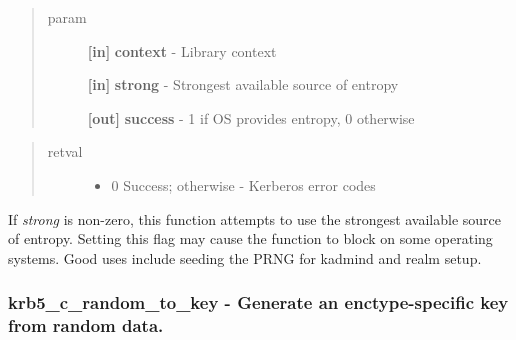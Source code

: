\documentclass[letterpaper,10pt,english]{sphinxmanual}
\begin{document}
\begin{quote}\begin{description}
\item[{param}] \leavevmode
\textbf{{[}in{]}} \textbf{context} - Library context

\textbf{{[}in{]}} \textbf{strong} - Strongest available source of entropy

\textbf{{[}out{]}} \textbf{success} - 1 if OS provides entropy, 0 otherwise

\end{description}\end{quote}
\begin{quote}\begin{description}
\item[{retval}] \leavevmode\begin{itemize}
\item {} 
0   Success; otherwise - Kerberos error codes

\end{itemize}

\end{description}\end{quote}

If \emph{strong} is non-zero, this function attempts to use the strongest available source of entropy. Setting this flag may cause the function to block on some operating systems. Good uses include seeding the PRNG for kadmind and realm setup.


\subsubsection{krb5\_c\_random\_to\_key -  Generate an enctype-specific key from random data.}
\label{appdev/refs/api/krb5_c_random_to_key:krb5-c-random-to-key-generate-an-enctype-specific-key-from-random-data}\label{appdev/refs/api/krb5_c_random_to_key::doc}

\begin{fulllineitems}
\label{appdev/refs/api/krb5_c_random_to_key:c.krb5_c_random_to_key}
\end{fulllineitems}
\end{document}
